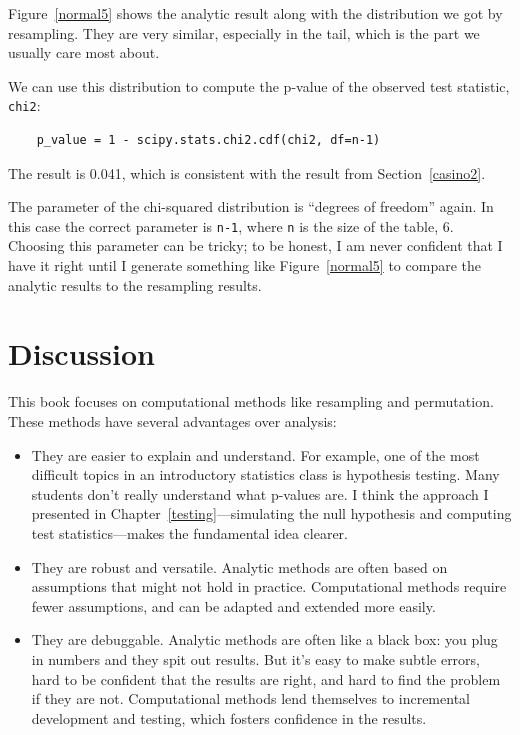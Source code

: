 \documentclass[12pt]{book}
\begin{document}
Figure~\ref{normal5} shows the analytic result along with the
distribution we got by resampling.  They are very similar,
especially in the tail, which is the part we usually care most
about.

We can use this distribution to compute the p-value of the
observed test statistic, \verb"chi2":

\begin{verbatim}
    p_value = 1 - scipy.stats.chi2.cdf(chi2, df=n-1)
\end{verbatim}

The result is 0.041, which is consistent with the result
from Section~\ref{casino2}.

The parameter of the chi-squared distribution is ``degrees of
freedom'' again.  In this case the correct parameter is \verb"n-1",
where \verb"n" is the size of the table, 6.  Choosing this parameter
can be tricky; to be honest, I am never confident that I have it
right until I generate something like Figure~\ref{normal5} to compare
the analytic results to the resampling results.


\section{Discussion}

This book focuses on computational methods like resampling and
permutation.  These methods have several advantages over analysis:

\begin{itemize}

\item They are easier to explain and understand.  For example, one of
  the most difficult topics in an introductory statistics class is
  hypothesis testing.  Many students don't really understand what
  p-values are.  I think the approach I presented in
  Chapter~\ref{testing}---simulating the null hypothesis and
  computing test statistics---makes the fundamental idea clearer.

\item They are robust and versatile.  Analytic methods are often based
  on assumptions that might not hold in practice.  Computational
  methods require fewer assumptions, and can be adapted and extended
  more easily.

\item They are debuggable.  Analytic methods are often like a black
  box: you plug in numbers and they spit out results.  But it's easy
  to make subtle errors, hard to be confident that the results are
  right, and hard to find the problem if they are not.  Computational
  methods lend themselves to incremental development and testing,
  which fosters confidence in the results.

\end{itemize}
\end{document}
